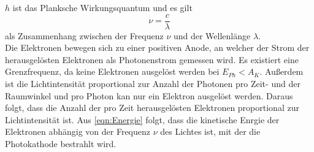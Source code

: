$h$ ist das Planksche Wirkungsquantum und es gilt
\begin{equation}
    \nu = \frac{c}{\lambda}
    \label{eqn:Frequenz}
\end{equation}
als Zusammenhang zwischen der Frequenz $\nu$ und der Wellenlänge $\lambda$.\\
Die Elektronen bewegen sich zu einer positiven Anode, an welcher der Strom der herausgelösten
Elektronen als Photonenstrom gemessen wird. Es existiert eine Grenzfrequenz, da keine Elektronen 
ausgelöst werden bei $E_{Ph} < A_K$. Außerdem ist die Lichtintensität proportional zur Anzahl der 
Photonen pro Zeit- und der Raumwinkel und pro Photon kan nur ein Elektron ausgelöst werden.
Daraus folgt, dass die Anzahl der pro Zeit herausgelösten Elektronen proportional zur Lichtintensität ist.
Aus \autoref{eqn:Energie} folgt, dass die kinetische Enrgie der Elektronen abhängig von der Frequenz $\nu$ des
Lichtes ist, mit der die Photokathode bestrahlt wird.

